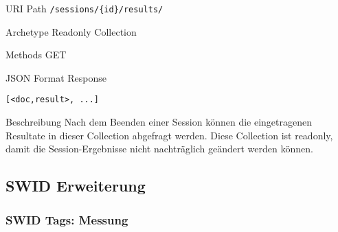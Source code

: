 \documentclass[10pt,a4paper]{scrartcl}
\begin{document}
\begin{mdframed}[style=def]
\begin{description*}
	\item[URI Path] \texttt{/sessions/\{id\}/results/}
	\item[Archetype] Readonly Collection
	\item[Methods] GET
	\item[JSON Format Response] \hfill
\begin{lstlisting}
[<doc,result>, ...]
\end{lstlisting}
	\item[Beschreibung] Nach dem Beenden einer Session können die eingetragenen
	Resultate in dieser Collection abgefragt werden. Diese Collection ist readonly,
	damit die Session-Ergebnisse nicht nachträglich geändert werden können.
\end{description*}
\end{mdframed}


\pagebreak


\subsection{SWID Erweiterung}

\subsubsection{SWID Tags: Messung}
\end{document}
